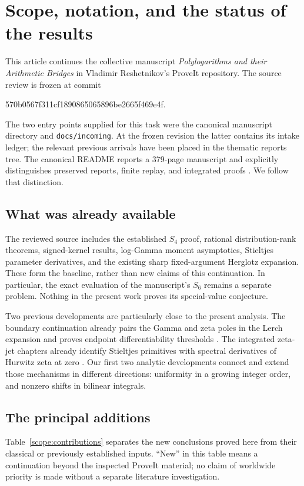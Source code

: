 \section{Scope, notation, and the status of the results}

This article continues the collective manuscript \emph{Polylogarithms and
their Arithmetic Bridges} in Vladimir Reshetnikov's ProveIt repository.
The source review is frozen at commit
\begin{center}\small\ttfamily
570b0567f311cf1890865065896be2665f469e4f.
\end{center}
The two entry points supplied for this task were the canonical manuscript
directory and \texttt{docs/incoming}. At the frozen revision the latter
contains its intake ledger; the relevant previous arrivals have been placed
in the thematic reports tree. The canonical README reports a 379-page
manuscript and explicitly distinguishes preserved reports, finite replay,
and integrated proofs \cite{repoManuscript}. We follow that distinction.

\subsection{What was already available}
The reviewed source includes the established $S_4$ proof, rational
distribution-rank theorems, signed-kernel results, log-Gamma moment
asymptotics, Stieltjes parameter derivatives, and the existing sharp
fixed-argument Herglotz expansion. These form the baseline, rather than new
claims of this continuation. In particular, the exact evaluation of the
manuscript's $S_6$ remains a separate problem. Nothing in the present work
proves its special-value conjecture.

Two previous developments are particularly close to the present analysis.
The boundary continuation already pairs the Gamma and zeta poles in the
Lerch expansion and proves endpoint differentiability thresholds
\cite{repoBoundary}. The integrated zeta-jet chapters already identify
Stieltjes primitives with spectral derivatives of Hurwitz zeta at zero
\cite{repoIntegration}. Our first two analytic developments connect and
extend those mechanisms in different directions: uniformity in a growing
integer order, and nonzero shifts in bilinear integrals.

\subsection{The principal additions}
Table~\ref{scope:contributions} separates the new conclusions proved here from their
classical or previously established inputs. ``New'' in this table means a
continuation beyond the inspected ProveIt material; no claim of worldwide
priority is made without a separate literature investigation.

